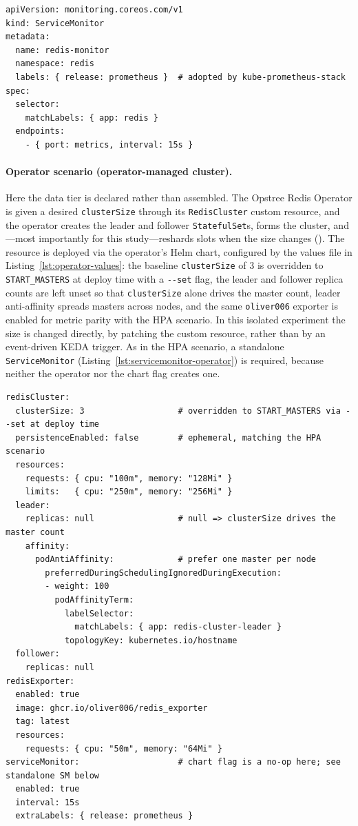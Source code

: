 \begin{lstlisting}[caption={\texttt{ServiceMonitor} for the HPA scenario exporter (\texttt{redis-servicemonitor.yaml}).},label={lst:servicemonitor-hpa}]
apiVersion: monitoring.coreos.com/v1
kind: ServiceMonitor
metadata:
  name: redis-monitor
  namespace: redis
  labels: { release: prometheus }  # adopted by kube-prometheus-stack
spec:
  selector:
    matchLabels: { app: redis }
  endpoints:
    - { port: metrics, interval: 15s }
\end{lstlisting}

\paragraph{Operator scenario (operator-managed cluster).}
Here the data tier is declared rather than assembled. The Opstree Redis Operator is given a
desired \texttt{clusterSize} through its \texttt{RedisCluster} custom resource, and the
operator creates the leader and follower \texttt{StatefulSet}s, forms the cluster, and---most
importantly for this study---reshards slots when the size changes
(\cite{k8s:operator,opstree:redisoperator}). The resource is deployed via the operator's Helm
chart, configured by the values file in Listing~\ref{lst:operator-values}: the baseline
\texttt{clusterSize} of $3$ is overridden to \texttt{START\_MASTERS} at deploy time with a
\texttt{-{}-set} flag, the leader and follower replica counts are left unset so that
\texttt{clusterSize} alone drives the master count, leader anti-affinity spreads masters
across nodes, and the same \texttt{oliver006} exporter is enabled for metric parity with the
HPA scenario. In this isolated experiment the size is changed directly, by patching the
custom resource, rather than by an event-driven KEDA trigger. As in the HPA scenario, a
standalone \texttt{ServiceMonitor} (Listing~\ref{lst:servicemonitor-operator}) is required,
because neither the operator nor the chart flag creates one.

\begin{lstlisting}[caption={Opstree Helm values producing the \texttt{RedisCluster} (\texttt{redis-operator-cluster-values.yaml}).},label={lst:operator-values}]
redisCluster:
  clusterSize: 3                   # overridden to START_MASTERS via --set at deploy time
  persistenceEnabled: false        # ephemeral, matching the HPA scenario
  resources:
    requests: { cpu: "100m", memory: "128Mi" }
    limits:   { cpu: "250m", memory: "256Mi" }
  leader:
    replicas: null                 # null => clusterSize drives the master count
    affinity:
      podAntiAffinity:             # prefer one master per node
        preferredDuringSchedulingIgnoredDuringExecution:
        - weight: 100
          podAffinityTerm:
            labelSelector:
              matchLabels: { app: redis-cluster-leader }
            topologyKey: kubernetes.io/hostname
  follower:
    replicas: null
redisExporter:
  enabled: true
  image: ghcr.io/oliver006/redis_exporter
  tag: latest
  resources:
    requests: { cpu: "50m", memory: "64Mi" }
serviceMonitor:                    # chart flag is a no-op here; see standalone SM below
  enabled: true
  interval: 15s
  extraLabels: { release: prometheus }
\end{lstlisting}

